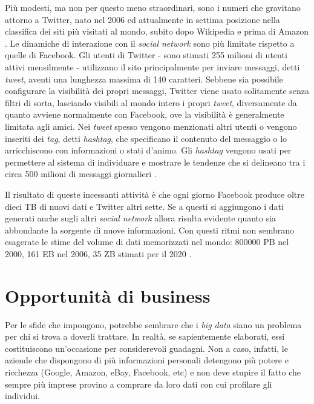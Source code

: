Più modesti, ma non per questo meno straordinari, sono i numeri che gravitano attorno a Twitter, nato nel 2006 ed attualmente in settima posizione nella classifica dei siti più 
visitati al mondo, subito dopo Wikipedia e prima di Amazon \cite{URL:alexatop}. Le dinamiche di interazione con il \textit{social network} sono più limitate rispetto a quelle 
di Facebook. Gli utenti di Twitter - sono stimati 255 milioni di utenti attivi mensilmente \cite{URL:mediastats2014} - 
utilizzano il sito principalmente per inviare messaggi, detti \textit{tweet}, aventi una lunghezza massima di 140 caratteri. Sebbene sia possibile configurare la visibilità dei propri messaggi, 
Twitter viene usato solitamente senza filtri di sorta, lasciando visibili al mondo intero i propri \textit{tweet}, diversamente da quanto avviene normalmente con Facebook, ove la visibilità è 
generalmente limitata agli amici. Nei \textit{tweet} spesso vengono menzionati altri utenti o vengono inseriti dei \textit{tag}, detti \textit{hashtag}, che specificano il contenuto del messaggio o lo 
arricchiscono con informazioni o stati d’animo. Gli \textit{hashtag} vengono usati per permettere al sistema di individuare e mostrare le tendenze che si delineano tra i circa 500 milioni 
di messaggi giornalieri \cite{URL:mediastats2014}.

Il risultato di queste incessanti attività è che ogni giorno Facebook produce oltre dieci TB di nuovi dati e Twitter altri sette. Se a questi si aggiungono i dati generati anche
sugli altri \textit{social network} allora risulta evidente quanto sia abbondante la sorgente di nuove informazioni. Con questi ritmi non sembrano esagerate le stime del volume di dati 
memorizzati nel mondo: 800000 PB nel 2000, 161 EB nel 2006, 35 ZB stimati per il 2020 \cite{ibm:def1} \cite{idcexp}.


\section{Opportunità di business}
\label{par:money}

Per le sfide che impongono, potrebbe sembrare che i \textit{big data} siano un problema per chi si trova a doverli trattare. In realtà, se sapientemente elaborati, essi costituiscono 
un’occasione per considerevoli guadagni. Non a caso, infatti, le aziende che dispongono di più informazioni personali detengono più potere e ricchezza (Google, Amazon, eBay, 
Facebook, etc) \cite{URL:top30ent} e non deve stupire il fatto che sempre più imprese provino a comprare da loro dati con cui profilare gli individui.

